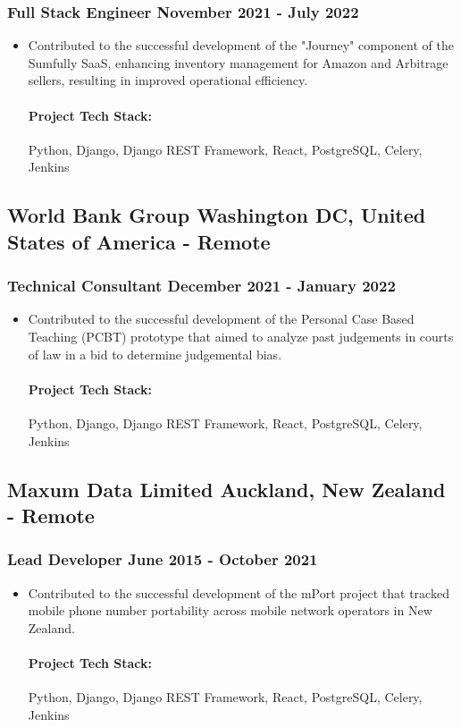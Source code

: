 \documentclass[11pt]{article} %
\begin{document}
\subsubsection{Full Stack Engineer \hfill  November 2021 - July 2022}
\begin{itemize}
    \item Contributed to the successful development of the "Journey" component of the Sumfully SaaS, enhancing inventory management for Amazon and Arbitrage sellers, resulting in improved operational efficiency.

    \paragraph{Project Tech Stack:} Python, Django, Django REST Framework, React, PostgreSQL, Celery, Jenkins
\end{itemize}


\subsection{World Bank Group \hfill Washington DC, United States of America - Remote}
\subsubsection{Technical Consultant \hfill  December 2021 - January 2022}
\begin{itemize}
    \item Contributed to the successful development of the Personal Case Based Teaching (PCBT) prototype that aimed to analyze past judgements in courts of law in a bid to determine judgemental bias.

    \paragraph{Project Tech Stack:} Python, Django, Django REST Framework, React, PostgreSQL, Celery, Jenkins
\end{itemize}


\subsection{Maxum Data Limited \hfill Auckland, New Zealand - Remote}
\subsubsection{Lead Developer \hfill  June 2015 - October 2021}
\begin{itemize}
    \item Contributed to the successful development of the mPort project that tracked mobile phone number portability across mobile network operators in New Zealand.

    \paragraph{Project Tech Stack:} Python, Django, Django REST Framework, React, PostgreSQL, Celery, Jenkins
\end{itemize}
\end{document}
